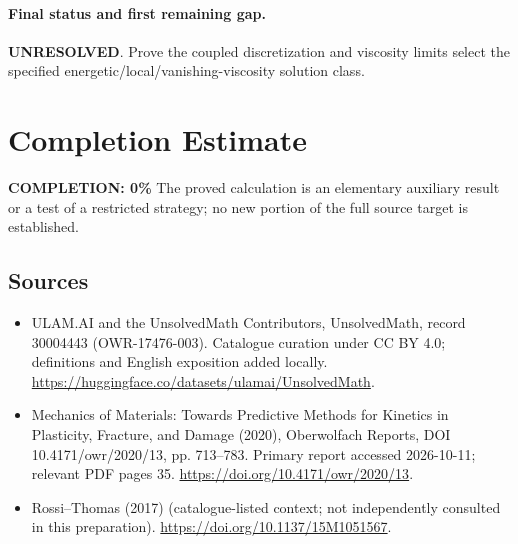 \documentclass[11pt]{article}
\begin{document}
\paragraph{Final status and first remaining gap.}
\textbf{UNRESOLVED}. Prove the coupled discretization and viscosity limits select the specified energetic/local/vanishing-viscosity solution class.

\section{Completion Estimate}
\noindent\textbf{COMPLETION: 0\%}
The proved calculation is an elementary auxiliary result or a test of a restricted strategy; no new portion of the full source target is established.

\subsection{Sources}
\begin{itemize}
\item[\hypertarget{source:30004443:1}{S1}] ULAM.AI and the UnsolvedMath Contributors, UnsolvedMath, record 30004443 (OWR-17476-003). Catalogue curation under CC BY 4.0; definitions and English exposition added locally.
\url{https://huggingface.co/datasets/ulamai/UnsolvedMath}.
\item[\hypertarget{source:30004443:2}{S2}] Mechanics of Materials: Towards Predictive Methods for Kinetics in Plasticity, Fracture, and Damage (2020), Oberwolfach Reports, DOI 10.4171/owr/2020/13, pp. 713--783. Primary report accessed 2026-10-11; relevant PDF pages 35.
\url{https://doi.org/10.4171/owr/2020/13}.
\item[\hypertarget{source:30004443:3}{S3}] Rossi--Thomas (2017) (catalogue-listed context; not independently consulted in this preparation).
\url{https://doi.org/10.1137/15M1051567}.
\end{itemize}
\label{end:30004443}
\end{document}
